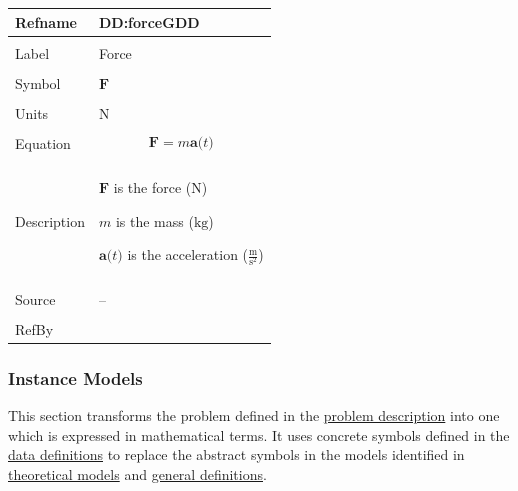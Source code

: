 \documentclass[12pt]{article}
\begin{document}
\vspace{\baselineskip}
\noindent
\begin{minipage}{\textwidth}
\begin{tabular}{>{\raggedright}p{}>{\raggedright\arraybackslash}p{}}
\toprule \textbf{Refname} & \textbf{DD:forceGDD}
\label{DD:forceGDD}
\\ \midrule \\
Label & Force
        
\\ \midrule \\
Symbol & $\symbf{F}$
         
\\ \midrule \\
Units & ${\text{N}}$
        
\\ \midrule \\
Equation & \begin{displaymath}
           \symbf{F}=m \symbf{a}\text{(}t\text{)}
           \end{displaymath}
\\ \midrule \\
Description & \begin{symbDescription}
              \item{$\symbf{F}$ is the force (${\text{N}}$)}
              \item{$m$ is the mass (${\text{kg}}$)}
              \item{$\symbf{a}\text{(}t\text{)}$ is the acceleration ($\frac{\text{m}}{\text{s}^{2}}$)}
              \end{symbDescription}
\\ \midrule \\
Source & --
         
\\ \midrule \\
RefBy & 
\\ \bottomrule
\end{tabular}
\end{minipage}

\subsubsection{Instance Models}
\label{Sec:IMs}
This section transforms the problem defined in the \hyperref[Sec:ProbDesc]{problem description} into one which is expressed in mathematical terms. It uses concrete symbols defined in the \hyperref[Sec:DDs]{data definitions} to replace the abstract symbols in the models identified in \hyperref[Sec:TMs]{theoretical models} and \hyperref[Sec:GDs]{general definitions}.
\end{document}

